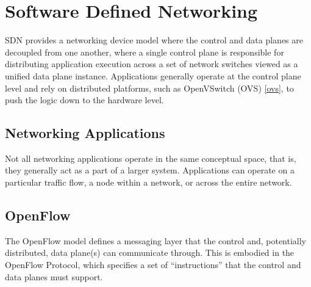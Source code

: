 \chapter{Software Defined Networking}
\label{sdn}
SDN provides a networking device model where the control and data planes are decoupled from one another, where a single control plane is responsible for distributing application execution across a set of network switches viewed as a unified data plane instance. Applications generally operate at the control plane level and rely on distributed platforms, such as OpenVSwitch (OVS) \ref{ovs}, to push the logic down to the hardware level.

\section{Networking Applications}
\label{sdn:apps}
Not all networking applications operate in the same conceptual space, that is, they generally act as a part of a larger system. Applications can operate on a particular traffic flow, a node within a network, or across the entire network.


\section{OpenFlow}
\label{sdn:of}
The OpenFlow model defines a messaging layer that the control and, potentially distributed, data plane(s) can communicate through. This is embodied in the OpenFlow Protocol, which specifies a set of ``instructions'' that the control and data planes must support. 